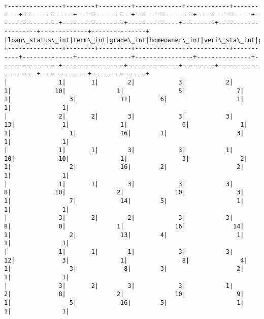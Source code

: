 \documentclass[11pt]{article}
\begin{document}
    \begin{Verbatim}[commandchars=\\\{\}]
+---------------+--------+---------+-------------+------------+-----------+--------------+---------------+----------------+---------------+----------------+-----------------+--------------+---------+--------------------+-------------+---------------+
|loan\_status\_int|term\_int|grade\_int|homeowner\_int|veri\_sta\_int|purpose\_int|emp\_length\_int|loan\_amnt\_strat|annual\_inc\_strat|revol\_bal\_strat|revol\_util\_strat|total\_pymnt\_strat|int\_rate\_strat|dti\_strat|inq\_last\_6mths\_strat|pub\_rec\_strat|total\_acc\_strat|
+---------------+--------+---------+-------------+------------+-----------+--------------+---------------+----------------+---------------+----------------+-----------------+--------------+---------+--------------------+-------------+---------------+
|              1|       1|        2|            3|           2|          1|            10|              1|               5|              7|               1|                3|            11|        6|                   1|            1|              1|
|              2|       2|        3|            3|           3|         13|             1|              1|               6|              1|               1|                1|            16|        1|                   3|            1|              1|
|              1|       1|        3|            3|           1|         10|            10|              1|               3|              2|               1|                2|            16|        2|                   2|            1|              1|
|              1|       1|        3|            3|           3|          8|            10|              2|              10|              3|               1|                7|            14|        5|                   1|            1|              1|
|              3|       2|        2|            3|           3|          8|             0|              1|              16|             14|               1|                2|            13|        4|                   1|            1|              1|
|              1|       1|        1|            3|           3|         12|             3|              1|               8|              4|               1|                3|             8|        3|                   2|            1|              1|
|              3|       2|        3|            3|           1|          2|             8|              2|              10|              9|               1|                5|            16|        5|                   1|            1|              1|

\end{Verbatim}
\end{document}
